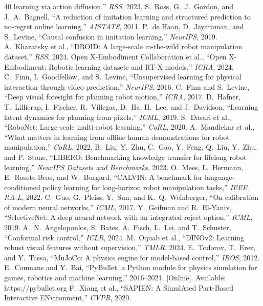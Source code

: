 \documentclass[conference]{IEEEtran}
\begin{document}
\begin{thebibliography}{40}
learning via action diffusion,'' \emph{RSS}, 2023.
 S.~Ross, G.~J.~Gordon, and J.~A.~Bagnell, ``A
reduction of imitation learning and structured prediction to no-regret online
learning,'' \emph{AISTATS}, 2011.
 P.~de Haan, D.~Jayaraman, and S.~Levine, ``Causal
confusion in imitation learning,'' \emph{NeurIPS}, 2019.
 A.~Khazatsky et al., ``DROID: A large-scale
in-the-wild robot manipulation dataset,'' \emph{RSS}, 2024.
 Open X-Embodiment Collaboration et al., ``Open
X-Embodiment: Robotic learning datasets and RT-X models,'' \emph{ICRA}, 2024.
 C.~Finn, I.~Goodfellow, and S.~Levine, ``Unsupervised
learning for physical interaction through video prediction,'' \emph{NeurIPS},
2016.
 C.~Finn and S.~Levine, ``Deep visual foresight for
planning robot motion,'' \emph{ICRA}, 2017.
 D.~Hafner, T.~Lillicrap, I.~Fischer, R.~Villegas,
D.~Ha, H.~Lee, and J.~Davidson, ``Learning latent dynamics for planning from
pixels,'' \emph{ICML}, 2019.
 S.~Dasari et al., ``RoboNet: Large-scale
multi-robot learning,'' \emph{CoRL}, 2020.
 A.~Mandlekar et al., ``What matters in
learning from offline human demonstrations for robot manipulation,''
\emph{CoRL}, 2022.
 B.~Liu, Y.~Zhu, C.~Gao, Y.~Feng, Q.~Liu, Y.~Zhu, and
P.~Stone, ``LIBERO: Benchmarking knowledge transfer for lifelong robot
learning,'' \emph{NeurIPS Datasets and Benchmarks}, 2023.
 O.~Mees, L.~Hermann, E.~Rosete-Beas, and W.~Burgard,
``CALVIN: A benchmark for language-conditioned policy learning for long-horizon
robot manipulation tasks,'' \emph{IEEE RA-L}, 2022.
 C.~Guo, G.~Pleiss, Y.~Sun, and K.~Q.~Weinberger,
``On calibration of modern neural networks,'' \emph{ICML}, 2017.
 Y.~Geifman and R.~El-Yaniv, ``SelectiveNet: A
deep neural network with an integrated reject option,'' \emph{ICML}, 2019.
 A.~N.~Angelopoulos, S.~Bates, A.~Fisch, L.~Lei,
and T.~Schuster, ``Conformal risk control,'' \emph{ICLR}, 2024.
 M.~Oquab et al., ``DINOv2: Learning robust visual
features without supervision,'' \emph{TMLR}, 2024.
 E.~Todorov, T.~Erez, and Y.~Tassa, ``MuJoCo: A
physics engine for model-based control,'' \emph{IROS}, 2012.
 E.~Coumans and Y.~Bai, ``PyBullet, a Python
module for physics simulation for games, robotics and machine learning,''
2016--2021. [Online]. Available: https://pybullet.org
 F.~Xiang et al., ``SAPIEN: A SimulAted Part-Based
Interactive ENvironment,'' \emph{CVPR}, 2020.
\end{thebibliography}
\end{document}
